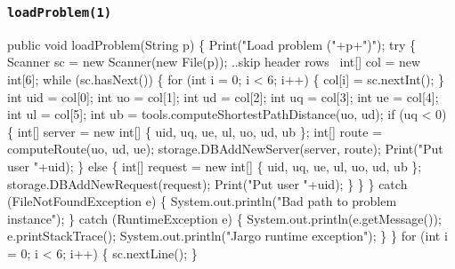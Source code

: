 \documentclass{article}
\def\nwendcode{\endtrivlist \endgroup}      %
\let\nwdocspar=\par
\begin{document}
\subsubsection{{\tt{}\protect{}loadProblem(1)}}
\nwenddocs{}\endmoddef{}
public void loadProblem(String p) \{
  Print("Load problem ("+p+")");
  try \{
    Scanner sc = new Scanner(new File(p));
    \LA{}..skip header rows~{\nwtagstyle{}}\RA{}
    int[] col = new int[6];
    while (sc.hasNext()) \{
      for (int i = 0; i < 6; i++) \{
        col[i] = sc.nextInt();
      \}
      int uid = col[0];
      int uo = col[1];
      int ud = col[2];
      int uq = col[3];
      int ue = col[4];
      int ul = col[5];
      int ub = tools.computeShortestPathDistance(uo, ud);
      if (uq < 0) \{
        int[] server = new int[] \{ uid, uq, ue, ul, uo, ud, ub \};
        int[] route = computeRoute(uo, ud, ue);
        storage.DBAddNewServer(server, route);
        Print("Put user "+uid);
      \} else \{
        int[] request = new int[] \{ uid, uq, ue, ul, uo, ud, ub \};
        storage.DBAddNewRequest(request);
        Print("Put user "+uid);
      \}
    \}
  \} catch (FileNotFoundException e) \{
    System.out.println("Bad path to problem instance");
  \} catch (RuntimeException e) \{
    System.out.println(e.getMessage());
    e.printStackTrace();
    System.out.println("Jargo runtime exception");
  \}
\}
\eatline
{}\nwendcode{}\endmoddef{}
for (int i = 0; i < 6; i++) \{
  sc.nextLine();
\}
\nwendcode{}\nwdocspar
\end{document}
